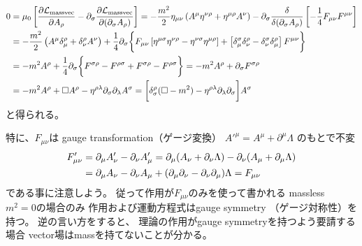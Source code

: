 \begin{subequations}
\begin{align}
    0
	&=
	\mu_0
\left[
    \dfrac{\partial \mathcal{L}_{\text{massvec}}}
        {\partial A_\rho}
	-
    \partial_\sigma
    \dfrac{\partial \mathcal{L}_{\text{massvec}}}
		{\partial (\partial_\sigma A_\rho)}
\right]
    =
    -
    \dfrac{m^2}{2}
        \eta_{\mu \nu}
        \left(
            A^\mu \eta^{\nu\rho}
        +
            \eta^{\mu\rho} A^\nu
        \right)
    -
    \partial_\sigma
    \dfrac{\delta}
        {\delta (\partial_\sigma A_\rho)}
        \left[
            - \dfrac{1}{4}
            F_{\mu\nu} F^{\mu\nu}
        \right]
\notag\\&
    =
    -
    \dfrac{m^2}{2}
        \left(
            A^\mu \delta_\mu^{\rho}
        +
            \delta_{\nu}^\rho A^\nu
        \right)
    +
    \dfrac{1}{4}
    \partial_\sigma
    \bigg\{
        F_{\mu\nu}
        \left[
            \eta^{\mu \sigma}
            \eta^{\nu \rho}
        -
            \eta^{\nu\sigma}
            \eta^{\mu \rho}
        \right]
    +
        \left[
            \delta_\mu^\sigma
            \delta_\nu^\rho
            -
            \delta_\nu^\sigma
            \delta_\mu^\rho        
        \right]
        F^{\mu\nu}
    \bigg\}
\notag\\&
    =
    -
    m^2
    A^\rho
    +
    \dfrac{1}{4}
    \partial_\sigma
    \bigg\{
        F^{\sigma\rho}
    -
        F^{\rho\sigma}
    +
        F^{\sigma\rho}
    -
        F^{\rho\sigma}
    \bigg\}
=
    -
    m^2
    A^\rho
    +
    \partial_\sigma
        F^{\sigma\rho}
\\&
=
    -
    m^2
    A^\rho
    +
    \Box A^\rho
    -
    \eta^{\rho \lambda}
    \partial_\sigma \partial_\lambda
    A^\sigma
=
    \bigg[
        \delta^\rho_\sigma
        (\Box - m^2)
    -
        \eta^{\rho \lambda}
        \partial_\lambda
        \partial_\sigma
    \bigg]
    A^\sigma
\label{free massive vector field EL eq}
\end{align}
\end{subequations}
と得られる。

特に、$F_{\mu\nu}$は
gauge transformation（ゲージ変換）
$A'^\mu = A^\mu + \partial^\mu \Lambda$
のもとで不変
\begin{align}
    F'_{\mu\nu}
&=
    \partial_\mu A'_\nu
    -
    \partial_\nu A'_\mu
=
    \partial_\mu (A_\nu + \partial_\nu \Lambda)
    -
    \partial_\nu (A_\mu + \partial_\mu \Lambda)
\notag\\&
=
    \partial_\mu A_\nu
    -
    \partial_\nu A_\mu
    + (
        \partial_\mu \partial_\nu
    -
        \partial_\nu \partial_\mu
    )\Lambda
=
    F_{\mu\nu}
\label{gauge invariance of vector field strength}
\end{align}
である事に注意しよう。
従って作用が$F_{\mu\nu}$のみを使って書かれる
massless $m^2 = 0$の場合のみ
作用および運動方程式はgauge symmetry
（ゲージ対称性）を持つ。
逆の言い方をすると、
理論の作用がgauge symmetryを持つよう要請する場合
vector場はmassを持てないことが分かる。

